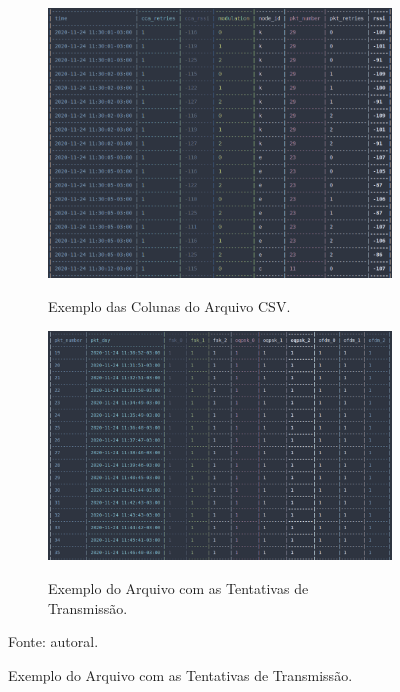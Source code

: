 \begin{figure}[h]
      \centering
      \caption{Dados do experimento.}
      \begin{subfigure}{.4\textwidth}
            \centering
            \caption{Exemplo das Colunas do Arquivo CSV.}
            \includegraphics[width=\textwidth]{./sections/textual/chapters/images/csv_example.png}
            \label{fig:csv_example}
      \end{subfigure}
      \begin{subfigure}{.4\textwidth}
            \centering
            \caption{Exemplo do Arquivo com as Tentativas de Transmissão.}
            \includegraphics[width=\textwidth]{./sections/textual/chapters/images/second_csv_example.png}
            \label{fig:second_csv_example}
      \end{subfigure}
      Fonte: autoral.
      \label{fig:test}
\end{figure}

